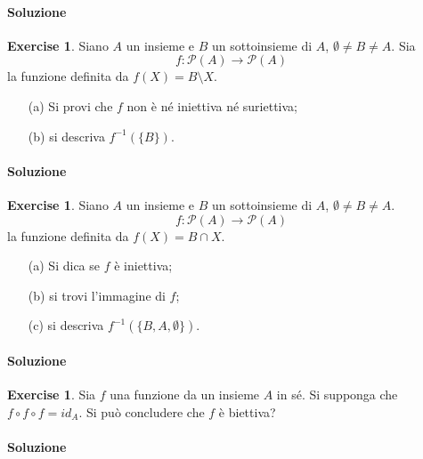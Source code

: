 \documentclass{article}
\theoremstyle{plain}
\theoremstyle{definition}
\newtheorem{xca}[exmp]{Exercise}
\theoremstyle{remark}
\begin{document}
\paragraph{Soluzione}

\begin{bxthm}
\begin{xca}
Siano $A$ un insieme e $B$ un sottoinsieme di $A$, $\emptyset \neq B \neq A$. Sia
\[
f : \mathcal{P}(A) \longrightarrow \mathcal{P}(A)
\]
la funzione definita da $f(X) = B \setminus X$.
\begin{itemize}
    \item[(a)] Si provi che $f$ non è né iniettiva né suriettiva;
    \item[(b)] si descriva $f^{-1}(\{B\})$.
\end{itemize}
\end{xca}
\end{bxthm}
\paragraph{Soluzione}

\begin{bxthm}
\begin{xca}
Siano $A$ un insieme e $B$ un sottoinsieme di $A$, $\emptyset \neq B \neq A$. 
\[
f : \mathcal{P}(A) \longrightarrow \mathcal{P}(A)
\]
la funzione definita da $f(X) = B \cap X$.
\begin{itemize}
    \item[(a)] Si dica se $f$ è iniettiva;
    \item[(b)] si trovi l'immagine di $f$;
    \item[(c)] si descriva $f^{-1}(\{B, A, \emptyset\})$.
\end{itemize}
\end{xca}
\end{bxthm}
\paragraph{Soluzione}

\begin{bxthm}
\begin{xca}
Sia $f$ una funzione da un insieme $A$ in sé. Si supponga che 
$f \circ f \circ f = id_A$. Si può concludere che $f$ è biettiva?
\end{xca}
\end{bxthm}
\paragraph{Soluzione}
\end{document}
